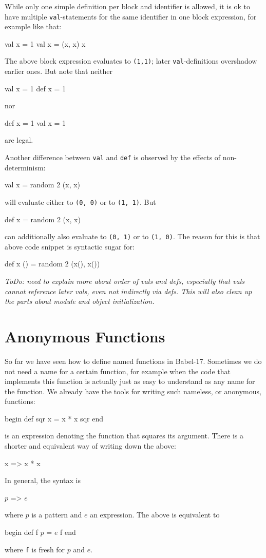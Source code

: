 \documentclass[11pt]{amsart}
\newcommand{\babelsrc}[1] {\lstinline!#1!}
\begin{document}
While only one simple definition per block and identifier is allowed, it is ok to have multiple \babelsrc{val}-statements for the same identifier in one block expression, for example like that:
\begin{babellisting}
val x = 1
val x = (x, x)
x
\end{babellisting}
The above block expression evaluates to \babelsrc{(1,1)}; later \babelsrc{val}-definitions overshadow earlier ones.
But note that neither
\begin{babellisting}
val x = 1
def x = 1
\end{babellisting}
nor
\begin{babellisting}
def x = 1
val x = 1
\end{babellisting}
are legal.

Another difference between \babelsrc{val} and \babelsrc{def} is observed by the effects of non-determinism:
\begin{babellisting}
val x = random 2
(x, x)
\end{babellisting}
will evaluate either to \babelsrc{(0, 0)} or to \babelsrc{(1, 1)}. But 
\begin{babellisting}
def x = random 2
(x, x)
\end{babellisting}
can additionally also evaluate to \babelsrc{(0, 1)} or to \babelsrc{(1, 0)}. The reason for this is that above code snippet is syntactic sugar for:
\begin{babellisting}
def x () = random 2
(x(), x())
\end{babellisting}

\emph{ToDo: need to explain more about order of vals and defs, especially that vals cannot reference later vals, even not indirectly via defs. This will also clean up the parts about module and object initialization.}

\section{Anonymous Functions}
So far we have seen how to define named functions in Babel-17. Sometimes we do not need a name for a certain function, for example when the code that implements this function is actually just as easy to understand as any name for the function. We already have the tools for writing such nameless, or anonymous, functions:
\begin{babellisting}
begin
  def sqr x = x * x 
  sqr
end
\end{babellisting}
is an expression denoting the function that squares its argument. There is a shorter and equivalent way of writing down the above:
\begin{babellisting}
x => x * x
\end{babellisting}
In general, the syntax is
\begin{babellisting}
$p$ => $e$
\end{babellisting}
where $p$ is a pattern and $e$ an expression. The above is equivalent to
\begin{babellisting}
begin
  def f $p$ = $e$ 
  f
end
\end{babellisting}
where \babelsrc{f} is fresh for $p$ and $e$.
\end{document}
